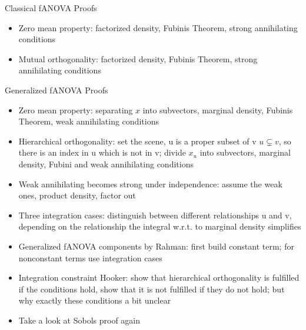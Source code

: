 
\begin{frame}{Classical fANOVA Proofs}
    \begin{itemize}
        \item Zero mean property: factorized density, Fubinis Theorem, strong annihilating conditions
        \item Mutual orthogonality: factorized density, Fubinis Theorem, strong annihilating conditions
    \end{itemize}
\end{frame}

\begin{frame}{Generalized fANOVA Proofs}
    \begin{itemize}
        \item Zero mean property: separating $x$ into subvectors, marginal density, Fubinis Theorem, weak annihilating conditions
        \item Hierarchical orthogonality: set the scene, u is a proper subset of v $u \subsetneq v$, so there is an index in u which is not in v; divide $x_u$ into subvectors, marginal density, Fubini and weak annihilating conditions
        \item Weak annihilating becomes strong under independence: assume the weak ones, product density, factor out
        \item Three integration cases: distinguish between different relationships u and v, depending on the relationship the integral w.r.t. to marginal density simplifies
        \item Generalized fANOVA components by Rahman: first build constant term; for nonconstant terms use integration cases
        \item Integration constraint Hooker: show that hierarchical orthogonality is fulfilled if the conditions hold, show that it is not fulfilled if they do not hold; but why exactly these conditions a bit unclear
        \item Take a look at Sobols proof again
    \end{itemize}
\end{frame}